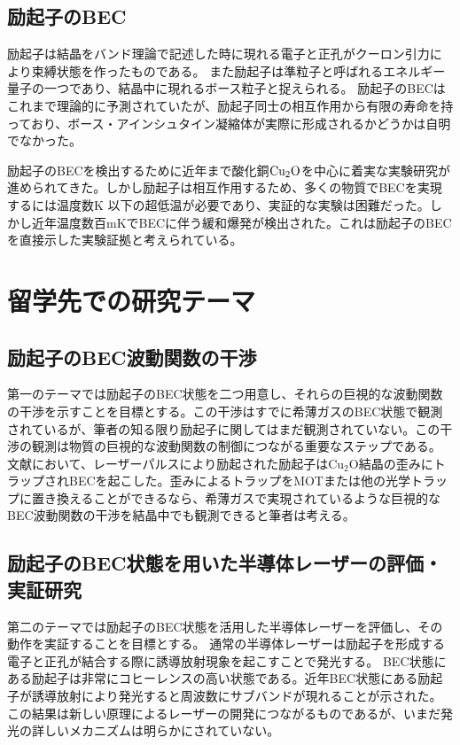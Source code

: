 \documentclass[11pt,a4paper]{jsarticle}
\begin{document}
\subsection{励起子のBEC}
励起子は結晶をバンド理論で記述した時に現れる電子と正孔がクーロン引力により束縛状態を作ったものである。
また励起子は準粒子と呼ばれるエネルギー量子の一つであり、結晶中に現れるボース粒子と捉えられる。
励起子のBECはこれまで理論的に予測されていたが\cite{Blatt}、励起子同士の相互作用から有限の寿命を持っており、ボース・アインシュタイン凝縮体が実際に形成されるかどうかは自明でなかった。

励起子のBECを検出するために近年まで酸化銅${\rm Cu_2O}$を中心に着実な実験研究が進められてきた\cite{Lin,David}。しかし励起子は相互作用するため、多くの物質でBECを実現するには温度数K 以下の超低温が必要であり、実証的な実験は困難だった。しかし近年温度数百mKでBECに伴う緩和爆発が検出された\cite{Yoshioka}。これは励起子のBECを直接示した実験証拠と考えられている。

\section{留学先での研究テーマ}
\subsection{励起子のBEC波動関数の干渉}
第一のテーマでは励起子のBEC状態を二つ用意し、それらの巨視的な波動関数の干渉を示すことを目標とする。この干渉はすでに希薄ガスのBEC状態で観測されているが\cite{Shin}、筆者の知る限り励起子に関してはまだ観測されていない。この干渉の観測は物質の巨視的な波動関数の制御につながる重要なステップである。
文献\cite{Lin,Yoshioka}において、レーザーパルスにより励起された励起子はCu$_2$O結晶の歪みにトラップされBECを起こした。歪みによるトラップをMOTまたは他の光学トラップに置き換えることができるなら、希薄ガスで実現されているような巨視的なBEC波動関数の干渉を結晶中でも観測できると筆者は考える。

\subsection{励起子のBEC状態を用いた半導体レーザーの評価・実証研究}
第二のテーマでは励起子のBEC状態を活用した半導体レーザーを評価し、その動作を実証することを目標とする。
通常の半導体レーザーは励起子を形成する電子と正孔が結合する際に誘導放射現象を起こすことで発光する。
BEC状態にある励起子は非常にコヒーレンスの高い状態である。近年BEC状態にある励起子が誘導放射により発光すると周波数にサブバンドが現れることが示された\cite{Horikiri}。この結果は新しい原理によるレーザーの開発につながるものであるが、いまだ発光の詳しいメカニズムは明らかにされていない。
\end{document}
